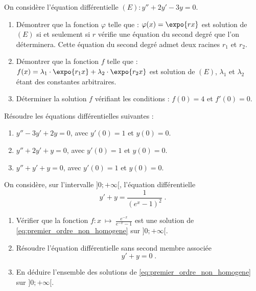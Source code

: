\begin{exo}
\label{exo:ed caracteristique}
      On consid\`ere l'\'equation diff\'erentielle $(E) : y''+2y'-3y=0$.
      \begin{enumerate}
            \item D\'emontrer que la fonction $\varphi$ telle que : $\varphi (x) = \expo{rx}$ est solution de $(E)$
                  si et seulement si $r$ v\'erifie une \'equation du second degr\'e que l'on d\'eterminera.
                  Cette \'equation du second degr\'e admet deux racines $r_1$ et $r_2$.
            \item D\'emontrer que la fonction $f$ telle que :
                  $f(x) = \lambda_1 \cdot \expo{r_1 x} + \lambda_2 \cdot \expo{r_2 x}$ est solution de $(E)$,
                  $\lambda_1$ et $\lambda_2$ \'etant des constantes arbitraires.
            \item D\'eterminer la solution $f$ v\'erifiant les conditions : $f(0) = 4$ et $f'(0) = 0$.
      \end{enumerate}
\end{exo}

\begin{exo}
\label{exo:ed second ordre}
R\'esoudre les \'equations diff\'erentielles suivantes :
\begin{enumerate}
\item $y'' - 3 y' + 2y = 0$, avec $y'(0) = 1$ et $y(0) = 0$.
\item $y'' + 2 y' + y = 0$, avec $y'(0) = 1$ et $y(0) = 0$.
\item $y'' + y' + y = 0$, avec $y'(0) = 1$ et $y(0) = 0$.
\end{enumerate}
\end{exo}

\begin{exo}
\label{exo:ed premier ordre second membre}
On consid\`ere, sur l'intervalle $]0 ; +\infty[$, l'\'equation diff\'erentielle
\begin{equation}
y' + y = \frac{1}{{\left(e^{x} - 1\right)}^{2}} \; .
\label{eq:premier_ordre_non_homogene}
\end{equation}
\begin{enumerate}
\item V\'erifier que la fonction $f : x \ {\mapsto}\  \frac{e^{-x}}{e^{-x} - 1}$
      est une solution de \eqref{eq:premier_ordre_non_homogene} sur $]0 ; +\infty[$.
\item R\'esoudre l'\'equation diff\'erentielle sans second membre associ\'ee
      \begin{equation}
      y' + y = 0 \; .
      \label{eq:premier_ordre_homogene}
      \end{equation}
\item En d\'eduire l'ensemble des solutions de \eqref{eq:premier_ordre_non_homogene} sur $]0 ; +\infty[$.
\end{enumerate}
\end{exo}

